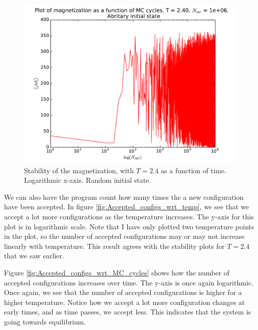 \documentclass[12pt]{article}
\begin{document}
\begin{figure}[H]
\centering
\includegraphics[width=\linewidth]{Plots/Magnetization_stability_logarithmic_T24.pdf}
\caption{Stability of the magnetization, with $T = 2.4$ as a function of time. Logarithmic x-axis. Random initial state.}
\label{fig:Mag_stab_log_T2}
\end{figure}


We can also have the program count how many times the a new configuration have been accepted. In figure \ref{fig:Accepted_configs_wrt_temp}, we see that we accept a lot more configurations as the temperature increases. The y-axis for this plot is in logarithmic scale. Note that I have only plotted two temperature points in the plot, so the number of accepted configurations may or may not increase linearly with temperature. This result agrees with the stability plots for $T=2.4$ that we saw earlier. 

Figure \ref{fig:Accepted_configs_wrt_MC_cycles} shows how the number of accepted configurations increases over time. The y-axis is once again logarithmic. Once again, we see that the number of accepted configurations is higher for a higher temperature. Notice how we accept a lot more configuration changes at early times, and as time passes, we accept less. This indicates that the system is going towards equilibrium. 
\end{document}
